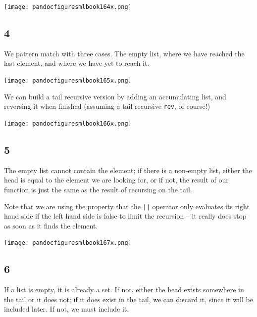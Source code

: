 \documentclass[]{book}
\begin{document}
\medskip
\begin{center}
\noindent\texttt{[image: pandocfiguresmlbook164x.png]}
\end{center}
\medskip

\subsection*{4}

We pattern match with three cases. The empty list, where we have reached the last element, and where we have yet to reach it.

\medskip
\begin{center}
\noindent\texttt{[image: pandocfiguresmlbook165x.png]}
\end{center}
\medskip

\noindent We can build a tail recursive version by adding an accumulating list, and reversing it when finished (assuming a tail recursive \texttt{rev}, of course!)

\medskip
\begin{center}
\noindent\texttt{[image: pandocfiguresmlbook166x.png]}
\end{center}
\medskip

\subsection*{5}

The empty list cannot contain the element; if there is a non-empty list, either the head is equal to the element we are looking for, or if not, the result of our function is just the same as the result of recursing on the tail.

Note that we are using the property that the \texttt{||} operator only evaluates its right hand side if the left hand side is false to limit the recursion -- it really does stop as soon as it finds the element.

\medskip
\begin{center}
\noindent\texttt{[image: pandocfiguresmlbook167x.png]}
\end{center}
\medskip

\subsection*{6}

If a list is empty, it is already a set. If not, either the head exists somewhere in the tail or it does not; if it does exist in the tail, we can discard it, since it will be included later. If not, we must include it.
\end{document}

